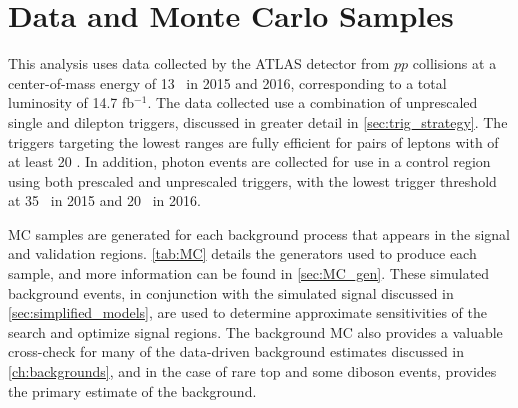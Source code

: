 \section{Data and Monte Carlo Samples} 

This analysis uses data collected by the \ac{ATLAS} detector from $pp$ collisions at a center-of-mass energy of 13 \tev~in 2015 and 2016, corresponding to a total luminosity of 14.7 fb$^{-1}$. The data collected use a combination of unprescaled single and dilepton triggers, discussed in greater detail in \autoref{sec:trig_strategy}. The triggers targeting the lowest \pt ranges are fully efficient for pairs of leptons with \pt of at least 20 \gev. In addition, photon events are collected for use in a control region using both prescaled and unprescaled triggers, with the lowest trigger threshold at 35 \gev~in 2015 and 20 \gev~in 2016. 

\ac{MC} samples are generated for each background process that appears in the signal and validation regions. \autoref{tab:MC} details the generators used to produce each sample, and more information can be found in \autoref{sec:MC_gen}. These simulated background events, in conjunction with the simulated signal discussed in \autoref{sec:simplified_models}, are used to determine approximate sensitivities of the search and optimize signal regions. The background \ac{MC} also provides a valuable cross-check for many of the data-driven background estimates discussed in \autoref{ch:backgrounds}, and in the case of rare top and some diboson events, provides the primary estimate of the background.

